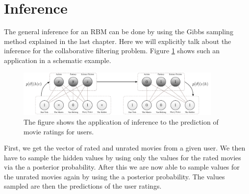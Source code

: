 \documentclass[crop=false,10pt]{standalone}
\begin{document}
  \section{Inference} %
  \label{sec:Inference}
    The general inference for an RBM can be done by using the Gibbs sampling method explained in the last chapter.
    Here we will explicitly talk about the inference for the collaborative filtering problem.
    Figure \ref{fig:rbm-inference-example} shows such an application in a schematic example.
    \begin{figure}[h]
      \center
      \includegraphics[width=0.9\textwidth]{figures/rbm-inference-example.pdf}
      \caption{%
        The figure shows the application of inference to the prediction of movie ratings for users.
      }
      \label{fig:rbm-inference-example}
    \end{figure}

    First, we get the vector of rated and unrated movies from a given user.
    We then have to sample the hidden values by using only the values for the rated movies via the a posterior probability.
    After this we are now able to sample values for the unrated movies again by using the a posterior probability.
    The values sampled are then the predictions of the user ratings.
\end{document}
